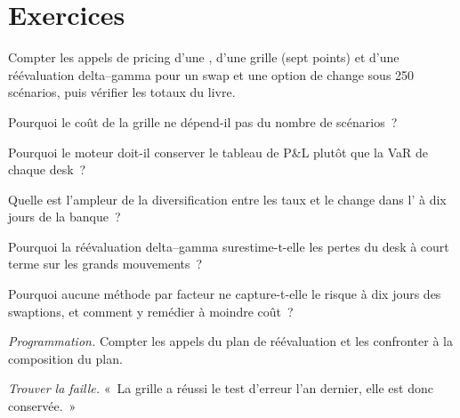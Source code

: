 \section{Exercices}

\begin{exercise}[$\star$]\label{exo:rc:build-a-risk-engine:1}
Compter les appels de pricing d'une , d'une grille (sept points) et d'une réévaluation delta--gamma pour un swap et une
option de change sous 250 scénarios, puis vérifier les totaux du livre.
\end{exercise}

\begin{exercise}[$\star$]\label{exo:rc:build-a-risk-engine:2}
Pourquoi le coût de la grille ne dépend-il pas du nombre de scénarios~?
\end{exercise}

\begin{exercise}[$\star$]\label{exo:rc:build-a-risk-engine:3}
Pourquoi le moteur doit-il conserver le tableau de P\&L plutôt que la VaR de chaque desk~?
\end{exercise}

\begin{exercise}[$\star\star$]\label{exo:rc:build-a-risk-engine:4}
Quelle est l'ampleur de la diversification entre les taux et le change dans l' à dix jours de la banque~?
\end{exercise}

\begin{exercise}[$\star\star$]\label{exo:rc:build-a-risk-engine:5}
Pourquoi la réévaluation delta--gamma surestime-t-elle les pertes du desk à court terme sur les grands mouvements~?
\end{exercise}

\begin{exercise}[$\star\star$]\label{exo:rc:build-a-risk-engine:6}
Pourquoi aucune méthode par facteur ne capture-t-elle le risque à dix jours des swaptions, et comment y remédier à moindre coût~?
\end{exercise}

\begin{exercise}[$\star\star\star$]\label{exo:rc:build-a-risk-engine:7}
\emph{Programmation.} Compter les appels du plan de réévaluation et les confronter à la composition du plan.
\end{exercise}

\begin{exercise}[$\star\star\star$]\label{exo:rc:build-a-risk-engine:8}
\emph{Trouver la faille.} «~La grille a réussi le test d'erreur l'an dernier, elle est donc conservée.~»
\end{exercise}

